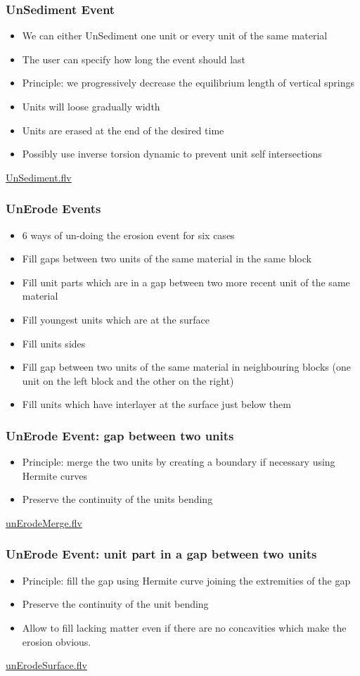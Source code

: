 \documentclass{beamer}
\begin{document}
	\begin{frame}
	\frametitle{UnSediment Event}
	\begin{itemize}
	\item We can either UnSediment one unit or every unit of the same material
	\item The user can specify how long the event should last 
	\item Principle: we progressively decrease the equilibrium length of vertical springs 
	\item Units will loose gradually width
	\item Units are erased at the end of the desired time
	\item Possibly use inverse torsion dynamic to prevent unit self intersections
	\end{itemize}
	\url{UnSediment.flv}
	\end{frame}
	
	\begin{frame}
	\frametitle{UnErode Events}
	\begin{itemize}
	\item 6 ways of un-doing the erosion event for six cases
	\item Fill gaps between two units of the same material in the same block
	\item Fill unit parts which are in a gap between two more recent unit of the same material
	\item Fill youngest units which are at the surface
	\item Fill units sides
	\item Fill gap between two units of the same material in neighbouring blocks (one unit on the left block and the other on the right)
	\item Fill units which have interlayer at the surface just below them
	\end{itemize}
	\end{frame}
	
	\begin{frame}
	\frametitle{UnErode Event: gap between two units}
	\begin{itemize}
	\item Principle: merge the two units by creating a boundary if necessary using Hermite curves
	\item Preserve the continuity of the units bending
	\end{itemize}
	\url{unErodeMerge.flv}
	\end{frame}		
	
	\begin{frame}
	\frametitle{UnErode Event: unit part in a gap between two units}
	\begin{itemize}
	\item Principle: fill the gap using Hermite curve joining the extremities of the gap
	\item Preserve the continuity of the unit bending 
	\item Allow to fill lacking matter even if there are no concavities which make the erosion obvious.
	\end{itemize}
	\url{unErodeSurface.flv}
	\end{frame}	
	
\end{document}
